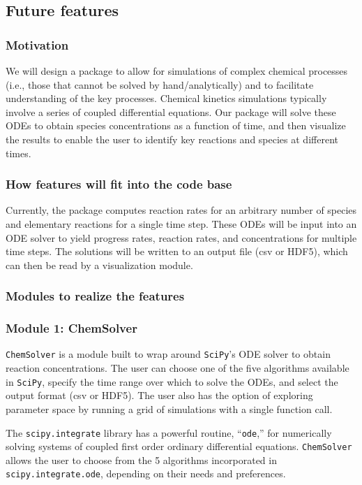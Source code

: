 \documentclass[12pt]{article}
\begin{document}
\subsection{Future features}
\subsubsection{Motivation}

We will design a package to allow for simulations of complex chemical processes (i.e., those that cannot be solved by hand/analytically) and to facilitate understanding of the key processes. Chemical kinetics simulations typically involve a series of coupled differential equations. Our package will solve these ODEs to obtain species concentrations as a function of time, and then visualize the results to enable the user to identify key reactions and species at different times.

\subsubsection{How features will fit into the code base}

Currently, the package computes reaction rates for an arbitrary number of species and elementary reactions for a single time step. These ODEs will be input into an ODE solver to yield progress rates, reaction rates, and concentrations for multiple time steps. The solutions will be written to an output file (csv or HDF5), which can then be read by a visualization module. 

\subsubsection{Modules to realize the features}

\subsubsection*{Module 1: ChemSolver}


\texttt{ChemSolver} is a module built to wrap around \texttt{SciPy}'s ODE solver to obtain reaction concentrations. The user can choose one of the five algorithms available in \texttt{SciPy}, specify the time range over which to solve the ODEs, and select the output format (csv or HDF5). The user also has the option of exploring parameter space by running a grid of simulations with a single function call. 

The \texttt{scipy.integrate} library has a powerful routine, “\texttt{ode},” for numerically solving systems of coupled first order ordinary differential equations. \texttt{ChemSolver} allows the user to choose from the 5 algorithms incorporated in \texttt{scipy.integrate.ode}, depending on their needs and preferences. 
 
\end{document}
